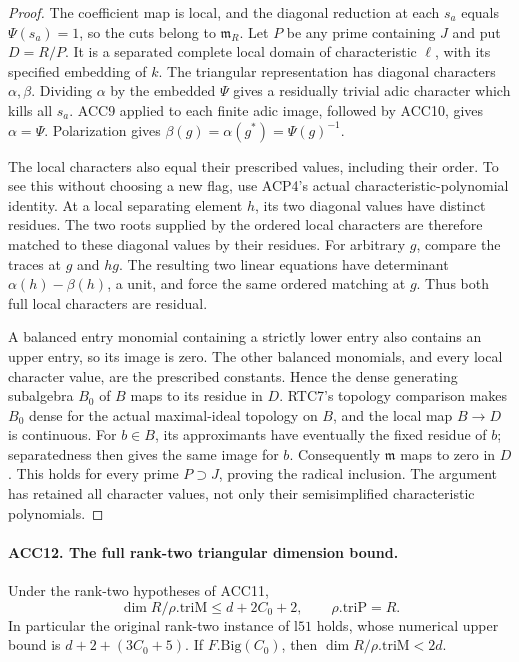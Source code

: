 \begin{proof}
The coefficient map is local, and the diagonal reduction at each
\(s_a\) equals \(\Psi(s_a)=1\), so the cuts belong to
\(\mathfrak m_R\).  Let \(P\) be any prime containing \(J\)
and put \(D=R/P\).  It is a separated complete local domain of
characteristic \(\ell\), with its specified embedding of \(k\).
The triangular representation has diagonal characters \(\alpha,
\beta\).  Dividing \(\alpha\) by the embedded \(\Psi\)
gives a residually trivial adic character which kills all \(s_a\).
ACC9 applied to each finite adic image, followed by ACC10, gives
\(\alpha=\Psi\).  Polarization gives
\(\beta(g)=\alpha(g^*)=\Psi(g)^{-1}\).

The local characters also equal their prescribed values, including
their order.  To see this without choosing a new flag, use ACP4's
actual characteristic-polynomial identity.  At a local separating
element \(h\), its two diagonal values have distinct residues.
The two roots supplied by the ordered local characters are therefore
matched to these diagonal values by their residues.  For arbitrary
\(g\), compare the traces at \(g\) and \(hg\).  The resulting
two linear equations have determinant
\(\alpha(h)-\beta(h)\), a unit, and force the same ordered
matching at \(g\).  Thus both full local characters are residual.

A balanced entry monomial containing a strictly lower entry also
contains an upper entry, so its image is zero.  The other balanced
monomials, and every local character value, are the prescribed
constants.  Hence the dense generating subalgebra \(B_0\) of
\(B\) maps to its residue in \(D\).  RTC7's topology comparison
makes \(B_0\) dense for the actual maximal-ideal topology on
\(B\), and the local map \(B\to D\) is continuous.  For
\(b\in B\), its approximants have eventually the fixed residue
of \(b\); separatedness then gives the same image for \(b\).
Consequently \(\mathfrak m\) maps to zero in \(D\).
This holds for every prime \(P\supset J\), proving the radical
inclusion.  The argument has retained all character values, not
only their semisimplified characteristic polynomials.
\end{proof}

\paragraph{ACC12. The full rank-two triangular dimension bound.}
\label{claim:ACC12}
Under the rank-two hypotheses of ACC11,
\[
 \dim R/\rho.\mathrm{triM}\le d+2C_0+2,
 \qquad \rho.\mathrm{triP}=R.                            \tag{ACC.20}
\]
In particular the original rank-two instance of \(\mathrm{l51}\)
holds, whose numerical upper bound is \(d+2+(3C_0+5)\).
If \(F.\mathrm{Big}(C_0)\), then
\(\dim R/\rho.\mathrm{triM}<2d\).


